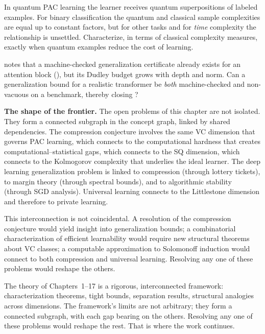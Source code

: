 \begin{openprob}
\label{op:quantum}
In quantum PAC learning the learner receives quantum superpositions of labeled
examples.  For binary classification the quantum and classical sample
complexities are equal up to constant factors, but for other tasks and for
\emph{time} complexity the relationship is unsettled.  Characterize, in terms
of classical complexity measures, exactly when quantum examples reduce the cost
of learning.
\end{openprob}

\begin{openprob}
\label{op:certified-transformer}
 notes that a machine-checked generalization
certificate already exists for an attention block
(), but its Dudley budget grows with depth and
norm.  Can a generalization bound for a realistic transformer be \emph{both}
machine-checked and non-vacuous on a benchmark, thereby closing ?
\end{openprob}

\bigskip

\begin{computational}
\textbf{The shape of the frontier.}
The open problems of this chapter are not isolated.  They form a connected
subgraph in the concept graph, linked by shared dependencies.  The
compression conjecture involves the same VC dimension that governs PAC
learning, which connects to the computational hardness that creates
computational--statistical gaps, which connects to the SQ dimension, which
connects to the Kolmogorov complexity that underlies the ideal learner.
The deep learning generalization problem is linked to compression (through
lottery tickets), to margin theory (through spectral bounds), and to
algorithmic stability (through SGD analysis).  Universal learning connects
to the Littlestone dimension and therefore to private learning.

This interconnection is not coincidental.  A resolution of the compression
conjecture would yield insight into generalization bounds; a combinatorial
characterization of efficient learnability would require new structural
theorems about VC classes; a computable approximation to Solomonoff induction
would connect to both compression and universal learning.  Resolving any one
of these problems would reshape the others.
\end{computational}

\bigskip

The theory of Chapters~1--17 is a rigorous, interconnected framework: characterization theorems, tight bounds, separation results, structural analogies across dimensions.  The framework's limits are not arbitrary; they form a connected subgraph, with each gap bearing on the others.  Resolving any one of these problems would reshape the rest.  That is where the work continues.
